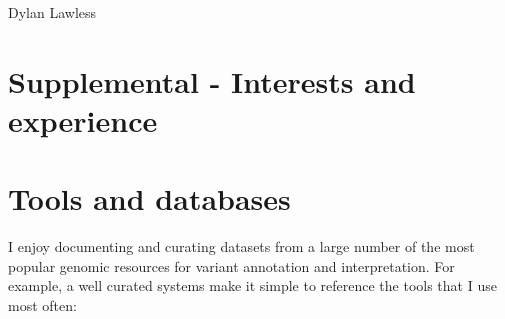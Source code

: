 \documentclass[11pt,a4paper]{article}
\begin{document}
\begin{cv}{Dylan Lawless}
\begin{itemize}[leftmargin=*]
\end{itemize}

\clearpage
\setcounter{page}{1}
\setlength\parindent{0pt}
\setlength{\parskip}{1em}
\section*{Supplemental - Interests and experience}

\section*{Tools and databases}
I enjoy documenting and curating datasets from a large number of the most popular genomic resources for variant annotation and interpretation.
For example, a well curated systems make it simple to reference the tools that I use most often:


\end{cv}
\end{document}
